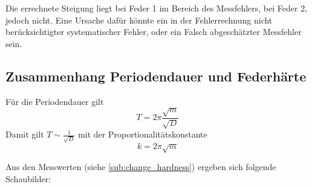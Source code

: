Die errechnete Steigung liegt bei Feder 1 im Bereich des Messfehlers, bei Feder 2, jedoch nicht. Eine Ursache dafür könnte ein in der Fehlerrechnung nicht berücksichtigter systematischer Fehler, oder ein Falsch abgeschätzter Messfehler sein.

\subsection{Zusammenhang Periodendauer und Federhärte}
Für die Periodendauer gilt
$$T = 2\pi \frac{\sqrt{m}}{\sqrt{D}}$$
Damit gilt $T \sim \frac{1}{\sqrt{D}}$ mit der Proportionalitätskonstante
$$k = 2\pi\sqrt{m}$$

Aus den Messwerten (siehe \ref{sub:change_hardness}) ergeben sich folgende Schaubilder: